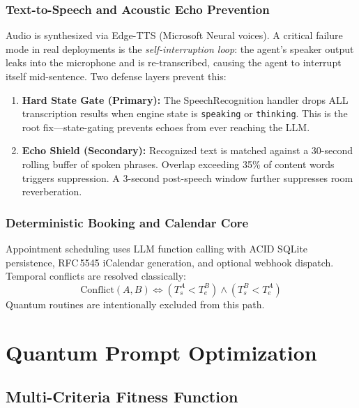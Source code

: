 \documentclass[conference]{IEEEtran}
\begin{document}
\subsubsection{Text-to-Speech and Acoustic Echo Prevention}
Audio is synthesized via Edge-TTS (Microsoft Neural voices). A critical failure mode in real deployments is the \textit{self-interruption loop}: the agent's speaker output leaks into the microphone and is re-transcribed, causing the agent to interrupt itself mid-sentence. Two defense layers prevent this:
\begin{enumerate}
    \item \textbf{Hard State Gate (Primary):} The SpeechRecognition handler drops ALL transcription results when engine state is \texttt{speaking} or \texttt{thinking}. This is the root fix---state-gating prevents echoes from ever reaching the LLM.
    \item \textbf{Echo Shield (Secondary):} Recognized text is matched against a 30-second rolling buffer of spoken phrases. Overlap exceeding 35\% of content words triggers suppression. A 3-second post-speech window further suppresses room reverberation.
\end{enumerate}

\subsubsection{Deterministic Booking and Calendar Core}
Appointment scheduling uses LLM function calling with ACID SQLite persistence, RFC\,5545 iCalendar generation, and optional webhook dispatch. Temporal conflicts are resolved classically:
\begin{equation}
\text{Conflict}(A,B) \iff (T_s^A < T_e^B) \land (T_s^B < T_e^A)
\end{equation}
Quantum routines are intentionally excluded from this path.

\section{Quantum Prompt Optimization}\label{sec:scoring}

\subsection{Multi-Criteria Fitness Function}
\end{document}
